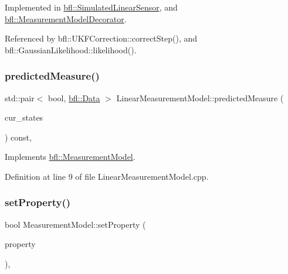 Implemented in \mbox{\hyperlink{classbfl_1_1SimulatedLinearSensor_a61c278bdbc5f3a0201d2f855a739d4f4}{bfl\+::\+Simulated\+Linear\+Sensor}}, and \mbox{\hyperlink{classbfl_1_1MeasurementModelDecorator_a36194c2f6abd7e13a417c3663febe921}{bfl\+::\+Measurement\+Model\+Decorator}}.



Referenced by bfl\+::\+U\+K\+F\+Correction\+::correct\+Step(), and bfl\+::\+Gaussian\+Likelihood\+::likelihood().

\mbox{\label{classbfl_1_1LinearMeasurementModel_a8831b8acb4790db4c69db73200375c69}} 
\subsubsection{\texorpdfstring{predicted\+Measure()}{predictedMeasure()}}
{\footnotesize\ttfamily std\+::pair$<$ bool, \mbox{\hyperlink{namespacebfl_af6b103c6821db1b54452f776fdd9dd02}{bfl\+::\+Data}} $>$ Linear\+Measurement\+Model\+::predicted\+Measure (\begin{DoxyParamCaption}\item[{const Eigen\+::\+Ref$<$ const Eigen\+::\+Matrix\+Xd $>$ \&}]{cur\+\_\+states }\end{DoxyParamCaption}) const\hspace{0.3cm}{\ttfamily [override]}, {\ttfamily [virtual]}}



Implements \mbox{\hyperlink{classbfl_1_1MeasurementModel_a8fc8798aa2db48f428d4ce59b33b5307}{bfl\+::\+Measurement\+Model}}.



Definition at line 9 of file Linear\+Measurement\+Model.\+cpp.

\mbox{\label{classbfl_1_1MeasurementModel_af97e18b52d1a3f365dd5982b8cc4aff7}} 
\subsubsection{\texorpdfstring{set\+Property()}{setProperty()}}
{\footnotesize\ttfamily bool Measurement\+Model\+::set\+Property (\begin{DoxyParamCaption}\item[{const std\+::string \&}]{property }\end{DoxyParamCaption})\hspace{0.3cm}{\ttfamily [virtual]}, {\ttfamily [inherited]}}



